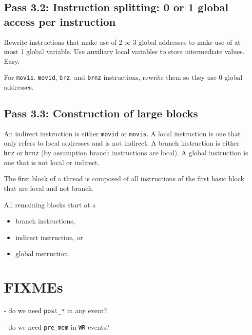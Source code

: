 \documentclass{llncs}
\begin{document}
\subsection*{Pass 3.2: Instruction splitting: 0 or 1 global access per instruction}

Rewrite instructions that make use of 2 or 3 global addresses to make use of at
most 1 global variable.
Use auxiliary local variables to store intermediate values. Easy.

For \verb!movis!, \verb!movid!, \verb!brz!, and \verb!brnz! instructions,
rewrite them so they use 0 global addresses.

\subsection*{Pass 3.3: Construction of large blocks}

An indirect instruction is either \verb!movid! or \verb!movis!.
A local instruction is one that only refers to local addresses and is not
indirect.
A branch instruction is either
\verb!brz! or \verb!brnz! (by assumption branch instructions are local).
A global instruction is one that is not local or indirect.

The first block of a thread is composed of all instructions of the first basic
block that are local and not branch.

All remaining blocks start at a
\begin{itemize}
\item branch instructions,
\item indirect instruction, or
\item global instruction.
\end{itemize}

\section{FIXMEs}

- do we need \verb!post_*! in any event?

- do we need \verb!pre_mem! in \verb!WR! events?




\end{document}
